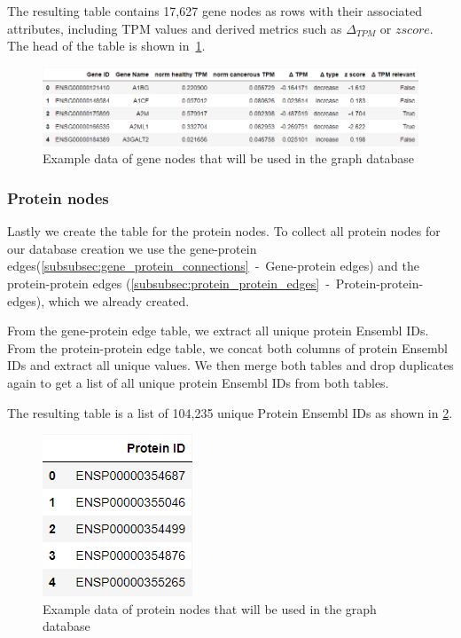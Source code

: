 The resulting table contains 17,627 gene nodes as rows with their associated attributes,
including TPM values and derived metrics such as $\Delta_{TPM}$ or $z score$.
The head of the table is shown in~\cref{fig:03_02_df_gene_nodes}.

\begin{figure}[h]
    \centering
    \includegraphics[height=\dfheight]{figures/03_02_gene_nodes}
    \caption{Example data of gene nodes that will be used in the graph database}
    \label{fig:03_02_df_gene_nodes}
\end{figure}




\subsubsection*{Protein nodes} \label{subsubsec:protein_nodes}
Lastly we create the table for the protein nodes.
To collect all protein nodes for our database creation we use the gene-protein edges(\cref{subsubsec:gene_protein_connections}~-~Gene-protein edges)
and the protein-protein edges (\ref{subsubsec:protein_protein_edges}~-~Protein-protein-edges), which we already created.

From the gene-protein edge table, we extract all unique protein Ensembl IDs.
From the protein-protein edge table, we concat both columns of protein Ensembl IDs and extract all unique values.
We then merge both tables and drop duplicates again to get a list of all unique protein Ensembl IDs from both tables.

The resulting table is a list of 104,235 unique Protein Ensembl IDs as shown in \cref{fig:03_02_df_protein_nodes}.

\begin{figure}[h]
    \centering
    \includegraphics[height=\dfheight]{figures/03_02_protein_nodes}
    \caption{Example data of protein nodes that will be used in the graph database}
    \label{fig:03_02_df_protein_nodes}
\end{figure}


